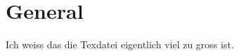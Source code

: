 \chapter{General} 
\label{cha:general}

Ich weiss das die Texdatei eigentlich viel zu gross ist. 

  